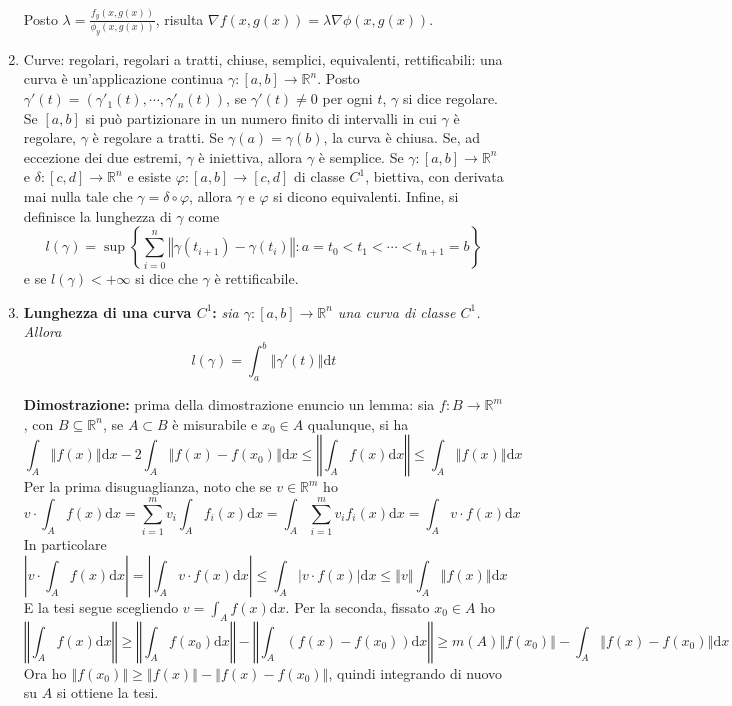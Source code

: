 \documentclass[a4paper,11pt]{article}
\newcommand{\norm}[1]{\left\Vert#1\right\Vert}
\begin{document}
\begin{enumerate}
	Posto $\lambda=\frac{f_y(x,g(x))}{\phi_y(x,g(x))}$, risulta $\nabla f(x,g(x))=\lambda\nabla \phi(x,g(x))$.
	\item Curve: regolari, regolari a tratti, chiuse, semplici, equivalenti, rettificabili: una curva è un'applicazione continua $\gamma\colon[a,b]\to\mathbb{R}^n$. Posto $\gamma'(t)=(\gamma'_1(t),\cdots,\gamma'_n(t))$, se $\gamma'(t)\neq0$ per ogni $t$, $\gamma$ si dice regolare. Se $[a,b]$ si può partizionare in un numero finito di intervalli in cui $\gamma$ è regolare, $\gamma$ è regolare a tratti. Se $\gamma(a)=\gamma(b)$, la curva è chiusa. Se, ad eccezione dei due estremi, $\gamma$ è iniettiva, allora $\gamma$ è semplice. Se $\gamma\colon[a,b]\to\mathbb{R}^n$ e $\delta\colon[c,d]\to\mathbb{R}^n$ e esiste $\varphi\colon[a,b]\to[c,d]$ di classe $C^1$, biettiva, con derivata mai nulla tale che $\gamma=\delta\circ\varphi$, allora $\gamma$ e $\varphi$ si dicono equivalenti. Infine, si definisce la lunghezza di $\gamma$ come
	\[l(\gamma)=\sup\left\{\sum_{i=0}^{n}\norm{\gamma(t_{i+1})-\gamma(t_{i})}:a=t_0<t_1<\cdots<t_{n+1}=b\right\}\]
	e se $l(\gamma)<+\infty$ si dice che $\gamma$ è rettificabile.
	\item\textbf{Lunghezza di una curva $C^1$:} \textit{sia $\gamma\colon[a,b]\to\mathbb{R}^n$ una curva di classe $C^1$. Allora
	\[l(\gamma)=\int_{a}^{b}\norm{\gamma'(t)}\mathrm{d}t\]}

	\textbf{Dimostrazione:} prima della dimostrazione enuncio un lemma: sia $f\colon B\to\mathbb{R}^m$, con $B\subseteq\mathbb{R}^n$, se $A\subset B$ è misurabile e $x_0\in A$ qualunque, si ha
	\[\int_A\norm{f(x)}\mathrm{d}x-2\int_A\norm{f(x)-f(x_0)}\mathrm{d}x\leq\norm{\int_Af(x)\mathrm{d}x}\leq\int_A\norm{f(x)}\mathrm{d}x\]
	Per la prima disuguaglianza, noto che se $v\in\mathbb{R}^m$ ho
	\[v\cdot\int_Af(x)\mathrm{d}x=\sum_{i=1}^{m}v_i\int_Af_i(x)\mathrm{d}x=\int_A\sum_{i=1}^{m}v_if_i(x)\mathrm{d}x=\int_Av\cdot f(x)\mathrm{d}x\]
	In particolare
	\[\left|v\cdot\int_A f(x)\mathrm{d}x\right|=\left|\int_Av\cdot f(x)\mathrm{d}x\right|\leq\int_A\left|v\cdot f(x)\right|\mathrm{d}x\leq\norm{v}\int_A\norm{f(x)}\mathrm{d}x\]
	E la tesi segue scegliendo $v=\int_Af(x)\mathrm{d}x$.
	Per la seconda, fissato $x_0\in A$ ho
	\[\norm{\int_Af(x)\mathrm{d}x}\geq\norm{\int_Af(x_0)\mathrm{d}x}-\norm{\int_A\left(f(x)-f(x_0)\right)\mathrm{d}x}\geq m(A)\norm{f(x_0)}-\int_A\norm{f(x)-f(x_0)}\mathrm{d}x\]
	Ora ho $\norm{f(x_0)}\geq\norm{f(x)}-\norm{f(x)-f(x_0)}$, quindi integrando di nuovo su $A$ si ottiene la tesi.
	

\end{enumerate}
\end{document}

